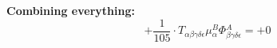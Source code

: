\documentclass{article}
\begin{document}
\textbf{Combining everything:}
\begin{equation}
+ \frac{1}{105} \cdot T_{\alpha{}\beta{}\gamma{}\delta{}\epsilon{}} \mu{}^{B}_{\alpha{}} \Phi{}^{A}_{\beta{}\gamma{}\delta{}\epsilon{}} = + 0
\end{equation}
\end{document}
